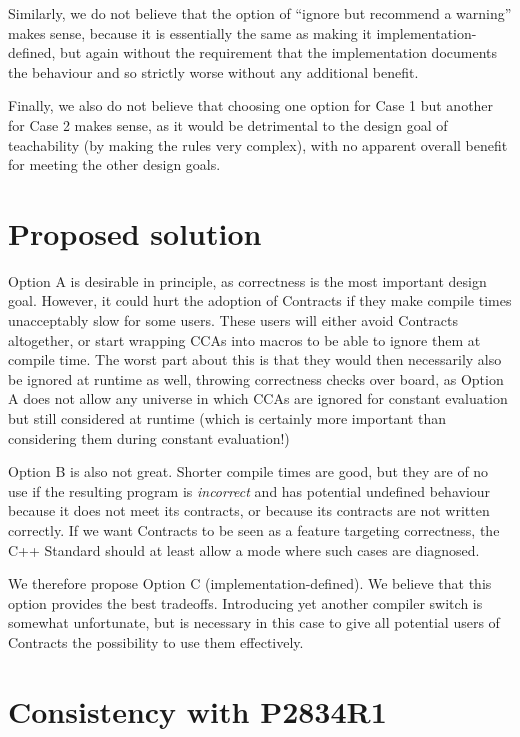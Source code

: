 Similarly, we do not believe that the option of ``ignore but recommend a warning'' makes sense, because it is essentially the same as making it implementation-defined, but again without the requirement that the implementation documents the behaviour and so strictly worse without any additional benefit.

Finally, we also do not believe that choosing one option for Case 1 but another for Case 2 makes sense, as it would be detrimental to the design goal of teachability (by making the rules very complex), with no apparent overall benefit for meeting the other design goals.

\section{Proposed solution}

Option A is desirable in principle, as correctness is the most important design goal. However, it could hurt the adoption of Contracts if they make compile times unacceptably slow for some users. These users will either avoid Contracts altogether, or start wrapping CCAs into macros to be able to ignore them at compile time. The worst part about this is that they would then necessarily also be ignored at runtime as well, throwing correctness checks over board, as Option A does not allow any universe in which CCAs are ignored for constant evaluation but still considered at runtime (which is certainly more important than considering them during constant evaluation!)

Option B is also not great. Shorter compile times are good, but they are of no use if the resulting program is \emph{incorrect} and has potential undefined behaviour because it does not meet its contracts, or because its contracts are not written correctly. If we want Contracts to be seen as a feature targeting correctness, the C++ Standard should at least allow a mode where such cases are diagnosed.

We therefore propose Option C (implementation-defined). We believe that this option provides the best tradeoffs. Introducing yet another compiler switch is somewhat unfortunate, but is necessary in this case to give all potential users of Contracts the possibility to use them effectively.

\section{Consistency with P2834R1}

